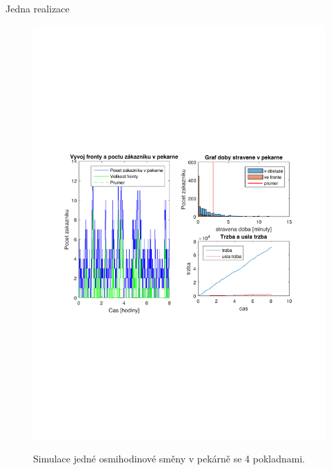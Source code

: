 \begin{frame}{Jedna realizace}
    \begin{figure}
\centering
\includegraphics[width=0.8\columnwidth]{imgs/jedenPrubeh4.pdf}
\label{fig:jedenPrubeh4}
\caption{Simulace jedné osmihodinové směny v pekárně se 4 pokladnami.}
\end{figure}
\end{frame}
